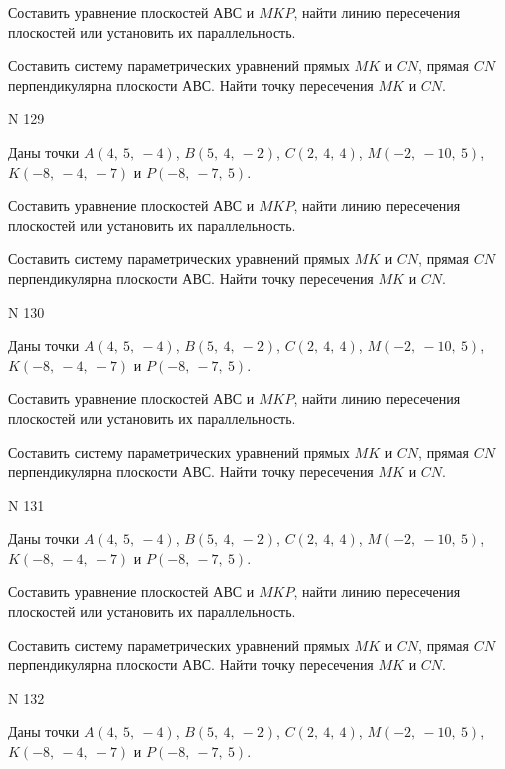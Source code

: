 \documentclass[11pt]{report}
\begin{document}
Составить уравнение плоскостей $АВС$ и $MKP$,
найти линию пересечения плоскостей или установить их параллельность.

Составить систему параметрических уравнений прямых $MK$ и $CN$,
прямая $CN$ перпендикулярна плоскости $АВС$. 
Найти точку пересечения $MK$ и $CN$.



 N 129

Даны точки $A\left( 4, \  5, \  -4\right)$, $B\left( 5, \  4, \  -2\right)$, $C\left( 2, \  4, \  4\right)$, $M\left( -2, \  -10, \  5\right)$, $K\left( -8, \  -4, \  -7\right)$ и $P\left( -8, \  -7, \  5\right)$.


Составить уравнение плоскостей $АВС$ и $MKP$,
найти линию пересечения плоскостей или установить их параллельность.

Составить систему параметрических уравнений прямых $MK$ и $CN$,
прямая $CN$ перпендикулярна плоскости $АВС$. 
Найти точку пересечения $MK$ и $CN$.



 N 130

Даны точки $A\left( 4, \  5, \  -4\right)$, $B\left( 5, \  4, \  -2\right)$, $C\left( 2, \  4, \  4\right)$, $M\left( -2, \  -10, \  5\right)$, $K\left( -8, \  -4, \  -7\right)$ и $P\left( -8, \  -7, \  5\right)$.


Составить уравнение плоскостей $АВС$ и $MKP$,
найти линию пересечения плоскостей или установить их параллельность.

Составить систему параметрических уравнений прямых $MK$ и $CN$,
прямая $CN$ перпендикулярна плоскости $АВС$. 
Найти точку пересечения $MK$ и $CN$.



 N 131

Даны точки $A\left( 4, \  5, \  -4\right)$, $B\left( 5, \  4, \  -2\right)$, $C\left( 2, \  4, \  4\right)$, $M\left( -2, \  -10, \  5\right)$, $K\left( -8, \  -4, \  -7\right)$ и $P\left( -8, \  -7, \  5\right)$.


Составить уравнение плоскостей $АВС$ и $MKP$,
найти линию пересечения плоскостей или установить их параллельность.

Составить систему параметрических уравнений прямых $MK$ и $CN$,
прямая $CN$ перпендикулярна плоскости $АВС$. 
Найти точку пересечения $MK$ и $CN$.



 N 132

Даны точки $A\left( 4, \  5, \  -4\right)$, $B\left( 5, \  4, \  -2\right)$, $C\left( 2, \  4, \  4\right)$, $M\left( -2, \  -10, \  5\right)$, $K\left( -8, \  -4, \  -7\right)$ и $P\left( -8, \  -7, \  5\right)$.
\end{document}
